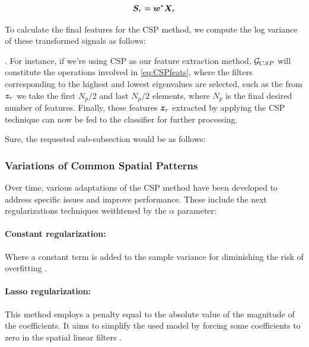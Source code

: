 \begin{equation}
\bm {S}_r = \bm {w}^* \bm {X}_r     
\end{equation}

To calculate the final features for the CSP method, we compute the log variance of these transformed signals as follows:

. For instance, if we're using CSP as our feature extraction method, $\mathcal {G}_{CSP}$ will constitute the operations involved in \eqref{eq:CSPfeats}, where the filters corresponding to the highest and lowest eigenvalues are selected, such as the from $\bm {z}_r$ we take the first $N_p/2$ and last $N_p/2$ elements, where $N_p$ is the final desired number of features. Finally, these features $\bm {z}_r$ extracted by applying the CSP technique can now be fed to the classifier for further processing.

Sure, the requested sub-subsection would be as follows:

\subsubsection{Variations of Common Spatial Patterns}

Over time, various adaptations of the CSP method have been developed to address specific issues and improve performance. These include the next regularizations techniques weithtened by the $\alpha$ parameter:

\paragraph{Constant regularization:} Where a constant term is added to the sample variance for diminishing the risk of overfitting \cite{park2017filter}.


\paragraph{Lasso regularization:} This method employs a penalty equal to the absolute value of the magnitude of the coefficients. It aims to simplify the used model by forcing some coefficients to zero in the spatial linear filters \cite{zhang2018new}.

